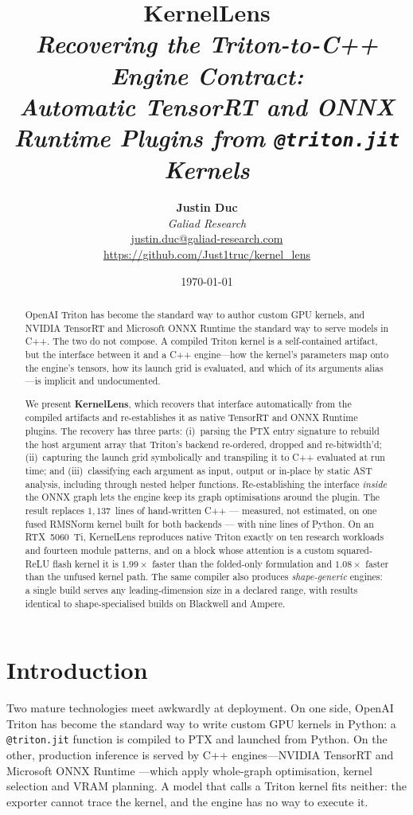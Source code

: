 \documentclass[11pt,a4paper]{article}
\title{\Huge \textbf{KernelLens} \\[0.45em]
\large \textit{Recovering the Triton-to-C++ Engine Contract:}\\[0.15em]
\large \textit{Automatic TensorRT and ONNX Runtime Plugins from \texttt{@triton.jit} Kernels}}
\author{\textbf{Justin Duc} \\ \textit{Galiad Research} \\ \url{justin.duc@galiad-research.com} \\ \url{https://github.com/Just1truc/kernel_lens}}
\date{\today}
\begin{document}
\maketitle

\begin{abstract}
OpenAI Triton has become the standard way to author custom GPU kernels, and
NVIDIA TensorRT and Microsoft ONNX Runtime the standard way to serve models in
C++. The two do not compose. A compiled Triton kernel is a self-contained
artifact, but the interface between it and a C++ engine---how the kernel's
parameters map onto the engine's tensors, how its launch grid is evaluated, and
which of its arguments alias---is implicit and undocumented.

We present \textbf{KernelLens}, which recovers that interface automatically from
the compiled artifacts and re-establishes it as native TensorRT and ONNX Runtime
plugins. The recovery has three parts: (i)~parsing the PTX entry signature to
rebuild the host argument array that Triton's backend re-ordered, dropped and
re-bitwidth'd; (ii)~capturing the launch grid symbolically and transpiling it to
C++ evaluated at run time; and (iii)~classifying each argument as input, output
or in-place by static AST analysis, including through nested helper functions.
Re-establishing the interface \emph{inside} the ONNX graph lets the engine keep
its graph optimisations around the plugin. The result replaces $1{,}137$~lines
of hand-written C++ --- measured, not estimated, on one fused RMSNorm kernel
built for both backends --- with nine lines of Python. On an
RTX~5060~Ti, KernelLens reproduces native Triton exactly on ten research
workloads and fourteen module patterns, and on a block whose attention is a
custom squared-ReLU flash kernel it is $1.99\times$ faster than the folded-only
formulation and $1.08\times$ faster than the unfused kernel path. The same
compiler also produces \emph{shape-generic} engines: a single build serves any
leading-dimension size in a declared range, with results identical to
shape-specialised builds on Blackwell and Ampere.
\end{abstract}

\section{Introduction}

Two mature technologies meet awkwardly at deployment. On one side, OpenAI Triton
\cite{triton2019} has become the standard way to write custom GPU kernels in
Python: a \texttt{@triton.jit} function is compiled to PTX and launched from
Python. On the other, production inference is served by C++ engines---NVIDIA
TensorRT \cite{tensorrt} and Microsoft ONNX Runtime \cite{onnxruntime}---which
apply whole-graph optimisation, kernel selection and VRAM planning. A model that
calls a Triton kernel fits neither: the exporter cannot trace the kernel, and the
engine has no way to execute it.
\end{document}
